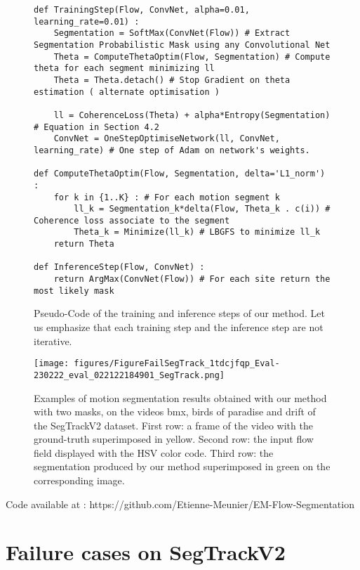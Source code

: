 \documentclass[10pt,twocolumn,letterpaper]{article}
\begin{document}
\begin{figure}[H]
\centering
{\footnotesize
\begin{verbatim}
def TrainingStep(Flow, ConvNet, alpha=0.01, learning_rate=0.01) :
    Segmentation = SoftMax(ConvNet(Flow)) # Extract Segmentation Probabilistic Mask using any Convolutional Net
    Theta = ComputeThetaOptim(Flow, Segmentation) # Compute theta for each segment minimizing ll
    Theta = Theta.detach() # Stop Gradient on theta estimation ( alternate optimisation )
    
    ll = CoherenceLoss(Theta) + alpha*Entropy(Segmentation) # Equation in Section 4.2
    ConvNet = OneStepOptimiseNetwork(ll, ConvNet, learning_rate) # One step of Adam on network's weights.

def ComputeThetaOptim(Flow, Segmentation, delta='L1_norm') : 
    for k in {1..K} : # For each motion segment k
    	ll_k = Segmentation_k*delta(Flow, Theta_k . c(i)) # Coherence loss associate to the segment
        Theta_k = Minimize(ll_k) # LBGFS to minimize ll_k
    return Theta

def InferenceStep(Flow, ConvNet) : 
    return ArgMax(ConvNet(Flow)) # For each site return the most likely mask
\end{verbatim}
}
	\vspace*{-1em}
	\caption{Pseudo-Code of the training and inference steps of our method. Let us emphasize that each training step and the inference step are not iterative.}
	\label{pytorch-code}
	\vspace*{-1em}
\end{figure}

\begin{figure*}[t!]
\label{failure-cases}
\texttt{[image: figures/FigureFailSegTrack\_1tdcjfqp\_Eval-230222\_eval\_022122184901\_SegTrack.png]}
\caption{Examples of motion segmentation results obtained with our method with two masks, on the videos bmx, birds of paradise and drift of the SegTrackV2 dataset. First row: a frame of the video with the ground-truth superimposed in yellow. Second row: the input flow field displayed with the HSV color code. Third row: the segmentation produced by our method superimposed in green on the corresponding image.}
\end{figure*}

\noindent Code available at : https://github.com/Etienne-Meunier/EM-Flow-Segmentation

\section{Failure cases on SegTrackV2}
\label{sec:multi_seg}
\end{document}
